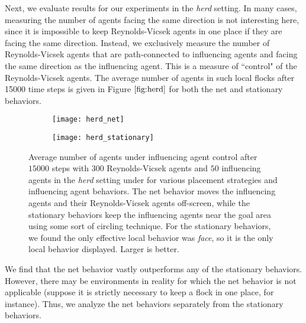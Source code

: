 Next, we evaluate results for our experiments in the \textit{herd} setting.
In many cases, measuring the number of agents facing the same direction is not
interesting here, since it is impossible to keep Reynolds-Vicsek agents in one place
if they are facing the same direction.
Instead, we exclusively measure the number of Reynolds-Vicsek agents that are
path-connected to influencing agents and facing the same direction as the influencing
agent.
This is a measure of ``control" of the Reynolds-Vicsek agents.
The average number of agents in such local flocks after 15000 time steps is given
in Figure $\ref{fig:herd}$ for both the net and stationary behaviors.
\begin{figure}
    \centering
    \begin{subfigure}[b]{\textwidth}
        \texttt{[image: herd\_net]}
    \end{subfigure}
    \begin{subfigure}[b]{\textwidth}
        \texttt{[image: herd\_stationary]}
    \end{subfigure}
    \caption{Average number of agents under influencing agent control after $15000$
    steps with $300$ Reynolds-Vicsek agents and $50$ influencing agents in the
    \textit{herd} setting under for various placement strategies
    and influencing agent behaviors.
    The net behavior moves the influencing agents and their Reynolds-Vicsek agents
    off-screen, while the stationary behaviors keep the influencing agents near
    the goal area using some sort of circling technique.
    For the stationary behaviors, we found the only effective local behavior
    was \textit{face}, so it is the only local behavior displayed.
    Larger is better.}
    \label{fig:herd}
\end{figure}
We find that the net behavior vastly outperforms any of the stationary
behaviors.
However, there may be environments in reality for which the net behavior is not
applicable (suppose it is strictly necessary to keep a flock in one place, for
instance).
Thus, we analyze the net behaviors separately from the stationary behaviors.


